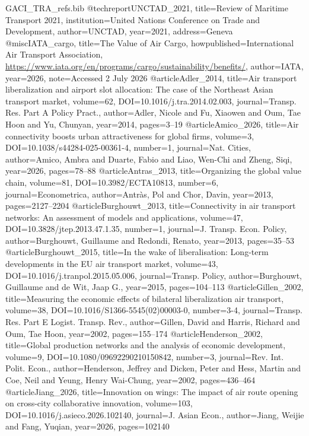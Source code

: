 \begin{filecontents*}[overwrite]{GACI_TRA_refs.bib}
@techreport{UNCTAD_2021, title={{Review of Maritime Transport 2021}}, institution={United Nations Conference on Trade and Development}, author={{UNCTAD}}, year={2021}, address={Geneva} }
@misc{IATA_cargo, title={The Value of Air Cargo}, howpublished={International Air Transport Association, \url{https://www.iata.org/en/programs/cargo/sustainability/benefits/}}, author={{IATA}}, year={2026}, note={Accessed 2 July 2026} }
@article{Adler_2014, title={Air transport liberalization and airport slot allocation: The case of the {Northeast Asian} transport market}, volume={62}, DOI={10.1016/j.tra.2014.02.003}, journal={Transp. Res. Part A Policy Pract.}, author={Adler, Nicole and Fu, Xiaowen and Oum, Tae Hoon and Yu, Chunyan}, year={2014}, pages={3--19} }
@article{Amico_2026, title={Air connectivity boosts urban attractiveness for global firms}, volume={3}, DOI={10.1038/s44284-025-00361-4}, number={1}, journal={Nat. Cities}, author={Amico, Ambra and Duarte, Fabio and Liao, Wen-Chi and Zheng, Siqi}, year={2026}, pages={78--88} }
@article{Antras_2013, title={Organizing the global value chain}, volume={81}, DOI={10.3982/ECTA10813}, number={6}, journal={Econometrica}, author={Antr\`as, Pol and Chor, Davin}, year={2013}, pages={2127--2204} }
@article{Burghouwt_2013, title={Connectivity in air transport networks: An assessment of models and applications}, volume={47}, DOI={10.3828/jtep.2013.47.1.35}, number={1}, journal={J. Transp. Econ. Policy}, author={Burghouwt, Guillaume and Redondi, Renato}, year={2013}, pages={35--53} }
@article{Burghouwt_2015, title={In the wake of liberalisation: Long-term developments in the {EU} air transport market}, volume={43}, DOI={10.1016/j.tranpol.2015.05.006}, journal={Transp. Policy}, author={Burghouwt, Guillaume and de Wit, Jaap G.}, year={2015}, pages={104--113} }
@article{Gillen_2002, title={Measuring the economic effects of bilateral liberalization air transport}, volume={38}, DOI={10.1016/S1366-5545(02)00003-0}, number={3-4}, journal={Transp. Res. Part E Logist. Transp. Rev.}, author={Gillen, David and Harris, Richard and Oum, Tae Hoon}, year={2002}, pages={155--174} }
@article{Henderson_2002, title={Global production networks and the analysis of economic development}, volume={9}, DOI={10.1080/09692290210150842}, number={3}, journal={Rev. Int. Polit. Econ.}, author={Henderson, Jeffrey and Dicken, Peter and Hess, Martin and Coe, Neil and Yeung, Henry Wai-Chung}, year={2002}, pages={436--464} }
@article{Jiang_2026, title={Innovation on wings: The impact of air route opening on cross-city collaborative innovation}, volume={103}, DOI={10.1016/j.asieco.2026.102140}, journal={J. Asian Econ.}, author={Jiang, Weijie and Fang, Yuqian}, year={2026}, pages={102140} }

\end{filecontents*}
